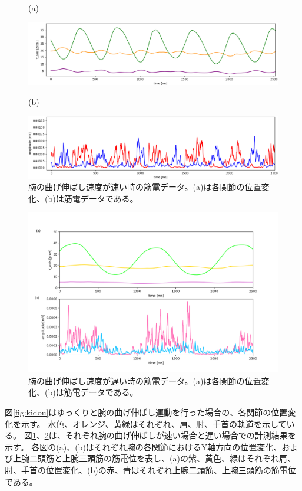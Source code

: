 \documentclass{jsarticle}
\begin{document}
\begin{figure}[htbp]
(a)

\includegraphics[width=17cm]{graph_image/fast_position.png}

(b)	

		\includegraphics[width=17cm]{graph_image/fast_EMG.png}
		\caption{腕の曲げ伸ばし速度が速い時の筋電データ。(a)は各関節の位置変化、(b)は筋電データである。}
		\label{fig:fast}	

\end{figure}
\clearpage

\begin{figure}[htbp]
	\includegraphics[width=17cm]{graph_image/slow_position_EMG.png}
	\caption{腕の曲げ伸ばし速度が遅い時の筋電データ。(a)は各関節の位置変化、(b)は筋電データである。}
	\label{fig:slow}		
\end{figure}

図\ref{fig:kidou}はゆっくりと腕の曲げ伸ばし運動を行った場合の、各関節の位置変化を示す。
水色、オレンジ、黄緑はそれぞれ、肩、肘、手首の軌道を示している。
図\ref{fig:fast}、\ref{fig:slow}は、それぞれ腕の曲げ伸ばしが速い場合と遅い場合での計測結果を示す。
各図の(a)、(b)はそれぞれ腕の各関節におけるY軸方向の位置変化、および上腕二頭筋と上腕三頭筋の筋電位を表し、(a)の紫、黄色、緑はそれぞれ肩、肘、手首の位置変化、(b)の赤、青はそれぞれ上腕二頭筋、上腕三頭筋の筋電位である。
\end{document}
